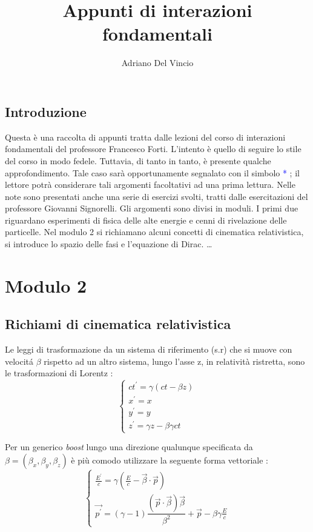 \documentclass[12pt,a4paper,twoside]{book}
\title{Appunti di interazioni fondamentali}
\author{Adriano Del Vincio}
\begin{document}
\maketitle

\section{Introduzione}
Questa è una raccolta di appunti tratta dalle lezioni del corso di interazioni fondamentali del professore Francesco Forti. 
L'intento è quello di seguire lo stile del corso in modo fedele. Tuttavia, di tanto in tanto, è presente qualche approfondimento. Tale caso sarà opportunamente segnalato con il simbolo \textcolor{blue}{*} ; il lettore potrà considerare tali argomenti facoltativi ad una prima lettura.
Nelle note sono presentati anche una serie di esercizi svolti, tratti dalle esercitazioni del professore Giovanni Signorelli. 
Gli argomenti sono divisi in moduli. I primi due riguardano esperimenti di fisica delle alte energie e cenni di rivelazione delle particelle. Nel modulo 2 si richiamano alcuni concetti di cinematica relativistica, si introduce lo spazio delle fasi e l'equazione di Dirac. \dots

\frontmatter
\tableofcontents 

\chapter{Modulo 2}\label{cap : Mod2}

\section{Richiami di cinematica relativistica}

Le leggi di trasformazione da un sistema di riferimento (s.r) che si muove con velocit\'a $\beta$ rispetto ad un altro sistema, lungo l'asse z, in relatività ristretta, sono le trasformazioni di Lorentz : 
\[
\begin{cases}
ct^{'}=\gamma (ct - \beta z) \\
x^{'}= x \\
y^{'}= y \\
z^{'}= \gamma z - \beta \gamma c t
\end{cases} 
\]

Per un generico \textit{boost} lungo una direzione qualunque specificata da $\beta = (\beta_{x}, \beta_{y}, \beta_{z})$ è più comodo utilizzare la seguente forma vettoriale :
\[
\begin{cases}
\frac{E^{'}}{c} = \gamma (\frac{E}{c} - \vec{\beta} \cdot \vec{p}) \\
\vec{p^{'}} =(\gamma - 1) \dfrac{( \vec{p} \cdot\vec{\beta}) \vec{\beta}}{\beta^{2}}  + \vec{p} - \beta \gamma \frac{E}{c}
\end{cases}
\]
\end{document}
